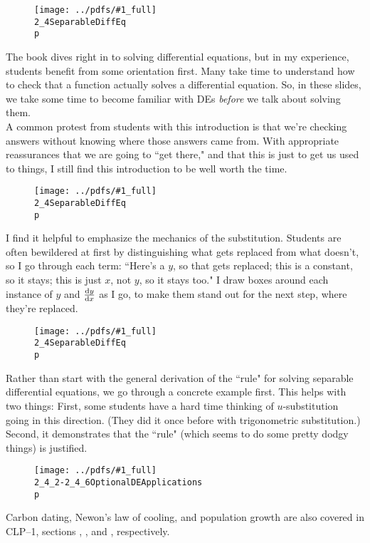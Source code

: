 \documentclass{beamer}
\newcommand{\notefig}[3]{%
	\begin{wrapfigure}{L}{3.5cm}
	\texttt{[image: ../pdfs/\#1\_full]}\\
	\footnotesize
	\texttt{#2}\\
	 \texttt{p \pageref{#3}}
	\end{wrapfigure}
	}
\begin{document}
\begin{frame}
\notefig{2_4SeparableDiffEq}{2\_4SeparableDiffEq}{note2.4a}
The book dives right in to solving differential equations, but in my experience, students benefit from some orientation first. Many take time to understand how to check that a function actually solves a differential equation. So, in these slides, we take some time to become familiar with DEs \textit{before} we talk about solving them.\\
A common protest from students with this introduction is that we're checking answers without knowing where those answers came from. With appropriate reassurances that we are going to ``get there," and that this is just to get us used to things, I still find this introduction to be well worth the time.
\end{frame}
\begin{frame}
\notefig{2_4SeparableDiffEq}{2\_4SeparableDiffEq}{note2.4b}
I find it helpful to emphasize the mechanics of the substitution. Students are often bewildered at first by distinguishing what gets replaced from what doesn't, so I go through each term: ``Here's a $y$, so that gets replaced; this is a constant, so it stays; this is just $x$, not $y$, so it stays too." I draw boxes around each instance of $y$ and $\frac{\text{d}y}{\text{d}x}$ as I go, to make them stand out for the next step, where they're replaced.
\end{frame}
\begin{frame}
\notefig{2_4SeparableDiffEq}{2\_4SeparableDiffEq}{note2.4c}
Rather than start with the general derivation of the ``rule" for solving separable differential equations, we go through a concrete example first. This helps with two things: First, some students have a hard time thinking of $u$-substitution going in this direction. (They did it once before with trigonometric substitution.) Second, it demonstrates that the ``rule" (which seems to do some pretty dodgy things) is justified.

\end{frame}

\begin{frame}
\notefig{2_4_2-2_4_6OptionalDEApplications}{2\_4\_2-2\_4\_6OptionalDEApplications}{note2.4.2a}

Carbon dating, Newon's law of cooling, and population growth are also covered in CLP--1, sections , , and , respectively.
\end{frame}
\end{document}
